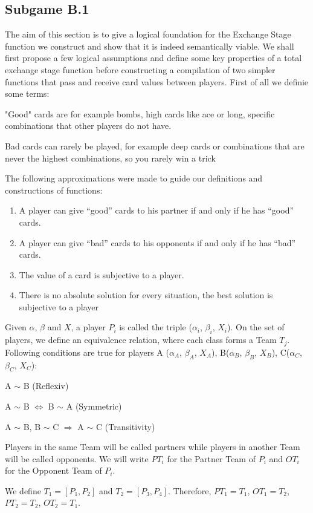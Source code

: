 \subsection{Subgame B.1}
The aim of this section is to give a logical foundation for the Exchange Stage function we construct and show that it is indeed semantically viable. We shall first propose a few logical assumptions and define some key properties of a total exchange stage function before constructing a compilation of two simpler functions that pass and receive card values between players. First of all we definie some terms:
\begin{definition}
"Good" cards are for example bombs, high cards like ace or long, specific combinations that other players do not have.
\end{definition}
\begin{definition}
Bad cards can rarely be played, for example deep cards or combinations that are never the highest combinations, so you rarely win a trick
\end{definition}
The following approximations were made to guide our definitions and constructions of functions:
\begin{enumerate}
\item A player can give “good” cards to his partner if and only if he has “good” cards.
\item A player can give “bad” cards to his opponents if and only if he has “bad” cards. 
\item The value of a card is subjective to a player. 
\item There is no absolute solution for every situation, the best solution is subjective to a player \\
\end{enumerate}
\begin{definition}
Given $\alpha$, $\beta$ and $X$, a player $P_i$ is called the triple ($\alpha_i$, $\beta_i$, $X_i$). 
On the set of players, we define an equivalence relation, where each class forms a Team $T_j$. Following conditions are true for players A ($\alpha_A$, $\beta_A$, $X_A$), B($\alpha_B$, $\beta_B$, $X_B$), C($\alpha_C$, $\beta_C$, $X_C$):
 \begin{axioms}[(P1)]
  \item A $\sim $ B (Reflexiv)
  \item A $\sim$ B $\Leftrightarrow$ B $\sim$ A (Symmetric)
  \item A $\sim$ B, B $\sim$ C $\Rightarrow$ A $\sim$ C (Transitivity)
  \end{axioms}
Players in the same Team will be called partners while players in another Team will be called opponents. We will write $PT_i$ for the Partner Team of $P_i$ and $OT_i$  for the Opponent Team of $P_i$.

We define $T_1 = [P_1,P_2]$  and $T_2 = [P_3,P_4]$. Therefore, $PT_1 = T_1$, $OT_1 = T_2$, $PT_2 = T_2$, $OT_2 = T_1$.

\end{definition}

